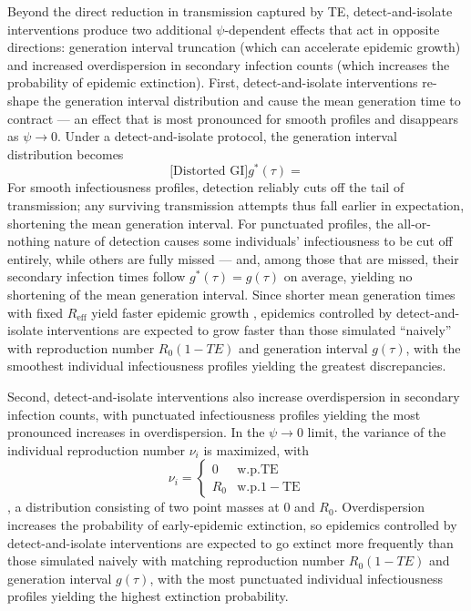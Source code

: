 Beyond the direct reduction in transmission captured by TE, detect-and-isolate interventions produce two additional $\psi$-dependent effects that act in opposite directions: generation interval truncation (which can accelerate epidemic growth) and increased overdispersion in secondary infection counts (which increases the probability of epidemic extinction). First, detect-and-isolate interventions re-shape the generation interval distribution and cause the mean generation time to contract --- an effect that is most pronounced for smooth profiles and disappears as $\psi \rightarrow 0$. Under a detect-and-isolate protocol, the generation interval distribution becomes 
\begin{equation}
\text{[Distorted GI]} g^*(\tau) = 
\end{equation}
For smooth infectiousness profiles, detection reliably cuts off the tail of transmission; any surviving transmission attempts thus fall earlier in expectation, shortening the mean generation interval. For punctuated profiles, the all-or-nothing nature of detection causes some individuals' infectiousness to be cut off entirely, while others are fully missed --- and, among those that are missed, their secondary infection times follow $g^*(\tau) = g(\tau)$ on average, yielding no shortening of the mean generation interval. Since shorter mean generation times with fixed $R_\text{eff}$ yield faster epidemic growth  \citep{wallinga_how_2007}, epidemics controlled by detect-and-isolate interventions are expected to grow faster than those simulated ``naively'' with reproduction number $R_0 (1 - TE)$ and generation interval $g(\tau)$, with the smoothest individual infectiousness profiles yielding the greatest discrepancies.

Second, detect-and-isolate interventions also increase overdispersion in secondary infection counts, with punctuated infectiousness profiles yielding the most pronounced increases in overdispersion. In the $\psi \rightarrow 0$ limit, the variance of the individual reproduction number $\nu_i$ is maximized, with 
\begin{equation}
	\nu_i = \begin{cases}
		0 & \text{w.p.}  \text{TE} \\ 
		R_0  & \text{w.p.} 1-\text{TE}
	\end{cases}
\end{equation}
\ie, a distribution consisting of two point masses at 0 and $R_0$. Overdispersion increases the probability of early-epidemic extinction, so epidemics controlled by detect-and-isolate interventions are expected to go extinct more frequently than those simulated naively with matching reproduction number $R_0 (1-TE)$ and generation interval $g(\tau)$, with the most punctuated individual infectiousness profiles yielding the highest extinction probability. 

